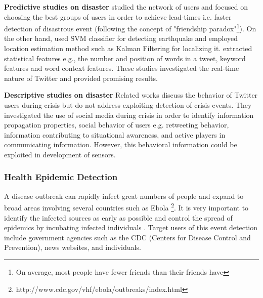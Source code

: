 \documentclass[11pt,a4paper]{article}
\begin{document}
\textbf{Predictive studies on disaster} \label{FP} \citet{sandy} studied the network of users and focused on choosing the best groups of users in order to achieve lead-times i.e. faster detection of disastrous event (following the concept of "friendship paradox"\footnote{On average, most people have fewer friends than their friends have}). On the other hand, \citet{sakakiEq2} used SVM classifier for detecting earthquake and employed location estimation method such as Kalman Filtering for localizing it. \citeauthor{sakakiEq2} extracted statistical features e.g., the number and position of words in a tweet, keyword features and word context features. These studies investigated the real-time nature of Twitter and provided promising results.

\textbf{Descriptive studies on disaster} Related works discuss the behavior of Twitter users during crisis \cite{vieweg, cheong, starbird} but do not address exploiting detection of crisis events. They investigated the use of social media during crisis in order to identify information propagation properties, social behavior of users e.g. retweeting behavior, information contributing to situational awareness, and active players in communicating information. However, this behavioral information could be exploited in development of sensors.

\subsubsection{Health Epidemic Detection}

A disease outbreak can rapidly infect great numbers of people and expand to broad areas involving several countries such as Ebola \footnote{http://www.cdc.gov/vhf/ebola/outbreaks/index.html}. It is very important to identify the infected sources as early as possible and control the spread of epidemics by incubating infected individuals \cite{eubank,cdcEpidemic}. Target users of this event detection include government agencies such as the CDC (Centers for Disease Control and Prevention), news websites, and individuals.
\end{document}
